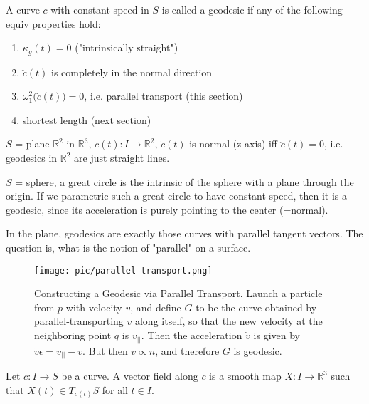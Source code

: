 \documentclass[10pt]{article}
\begin{document}
            \begin{definition}
                A curve $c$ with constant speed in $S$ is called a geodesic if any of the following equiv properties hold:
                \begin{enumerate}
                    \item $\kappa_g(t) = 0$ ("intrinsically straight")
                    \item $\ddot{c}(t)$ is completely in the normal direction
                    \item $\omega_1^2\big(\dot{c}(t)\big) = 0$, i.e. parallel transport (this section)
                    \item shortest length (next section)
                \end{enumerate}
            \end{definition}
            \begin{example}
                $S$ = plane $\mathbb{R}^2$ in $\mathbb{R}^3$, $c(t): I \rightarrow\mathbb{R}^2$, $\dot{c}(t)$ is normal (z-axis) iff $\ddot{c}(t) = 0$, i.e. geodesics in $\mathbb{R}^2$ are just straight lines.
            \end{example}
            \begin{example}
                $S$ = sphere, a great circle is the intrinsic of the sphere with a plane through the origin. If we parametric such a great circle to have constant speed, then it is a geodesic, since its acceleration is purely pointing to the center (=normal).
            \end{example}

            In the plane, geodesics are exactly those curves with parallel tangent vectors. The question is, what is the notion of "parallel" on a surface.
            \begin{figure}[H]
                \centering
                \texttt{[image: pic/parallel transport.png]}
                \caption{Constructing a Geodesic via Parallel Transport. Launch a particle from $p$ with velocity $v$, and define $G$ to be the curve obtained by parallel-transporting $v$ along itself, so that the new velocity at the neighboring point $q$ is $v_{||}$. Then the acceleration $\dot{v}$ is given by $\dot{v}\epsilon = v_{||} - v$. But then $\dot{v}\propto n$, and therefore $G$ is geodesic.}
            \end{figure}
            \begin{definition}
                Let $c:I\rightarrow S$ be a curve. A vector field along $c$ is a smooth map $X:I\rightarrow\mathbb{R}^3$ such that $X(t)\in T_{c(t)}S$ for all $t\in I$.
            \end{definition}
\end{document}
